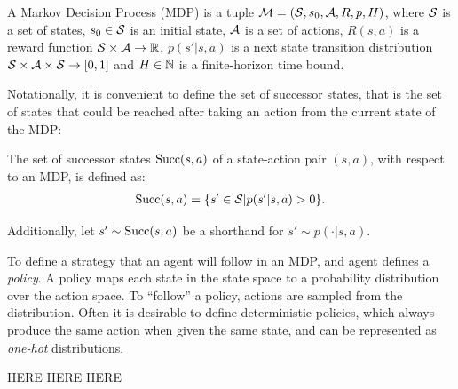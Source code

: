     \begin{defn}
        \label{def:mdp}
        A \textnormal{Markov Decision Process} (MDP) is a tuple $\mathcal{M}=(\mathcal{S},s_0,\mathcal{A},R,p,H)$, where $\mathcal{S}$ is a set of states, $s_0\in\mathcal{S}$ is an initial state, $\mathcal{A}$ is a set of actions, $R(s,a)$ is a reward function $\mathcal{S}\times \mathcal{A}\rightarrow \mathbb{R}$, $p(s' | s,a)$ is a next state transition distribution $\mathcal{S} \times \mathcal{A} \times \mathcal{S} \rightarrow [0,1]$ and $H\in\mathbb{N}$ is a finite-horizon time bound. 
    \end{defn}

    Notationally, it is convenient to define the set of successor states, that is the set of states that could be reached after taking an action from the current state of the MDP:
    \begin{defn}
        \label{def:succ}
        The set of \textnormal{successor states} ${\textnormal{Succ}(s,a)}$ of a state-action pair $(s,a)$, with respect to an MDP, is defined as: 
        \begin{align}
            {\textnormal{Succ}(s,a)}=\{s'\in\mathcal{S}|p(s'|s,a)>0\}.
        \end{align}
        
        Additionally, let $s'\sim {\textnormal{Succ}(s,a)}$ be a shorthand for $s'\sim p(\cdot|s,a)$.
    \end{defn}

    To define a strategy that an agent will follow in an MDP, and agent defines a \textit{policy}. A policy maps each state in the state space to a probability distribution over the action space. To ``follow'' a policy, actions are sampled from the distribution. Often it is desirable to define deterministic policies, which always produce the same action when given the same state, and can be represented as \textit{one-hot} distributions. 





    HERE HERE HERE





